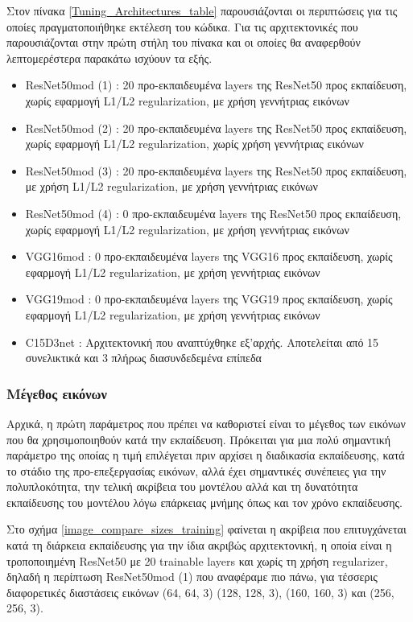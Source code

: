 Στον πίνακα \ref{Tuning_Architectures_table} παρουσιάζονται οι περιπτώσεις για τις οποίες πραγματοποιήθηκε εκτέλεση του κώδικα. Για τις αρχιτεκτονικές που παρουσιάζονται στην πρώτη στήλη του πίνακα και οι οποίες θα αναφερθούν λεπτομερέστερα παρακάτω ισχύουν τα εξής.

\begin{itemize}
\item ResNet50mod (1) : 20 προ-εκπαιδευμένα layers της ResNet50 προς εκπαίδευση, χωρίς εφαρμογή L1/L2 regularization, με χρήση γεννήτριας εικόνων
\item ResNet50mod (2) : 20 προ-εκπαιδευμένα layers της ResNet50 προς εκπαίδευση, χωρίς εφαρμογή L1/L2 regularization, χωρίς χρήση γεννήτριας εικόνων
\item ResNet50mod (3) : 20 προ-εκπαιδευμένα layers της ResNet50 προς εκπαίδευση, με χρήση L1/L2 regularization, με χρήση γεννήτριας εικόνων
\item ResNet50mod (4) : 0 προ-εκπαιδευμένα layers της ResNet50 προς εκπαίδευση, χωρίς εφαρμογή L1/L2 regularization, με χρήση γεννήτριας εικόνων
\item VGG16mod : 0 προ-εκπαιδευμένα layers της VGG16 προς εκπαίδευση, χωρίς εφαρμογή L1/L2 regularization, με χρήση γεννήτριας εικόνων
\item VGG19mod : 0 προ-εκπαιδευμένα layers της VGG19 προς εκπαίδευση, χωρίς εφαρμογή L1/L2 regularization, με χρήση γεννήτριας εικόνων
\item C15D3net : Αρχιτεκτονική που αναπτύχθηκε εξ'αρχής. Αποτελείται από 15 συνελικτικά και 3 πλήρως διασυνδεδεμένα επίπεδα 
\end{itemize}

\subsubsection{Μέγεθος εικόνων}

Αρχικά, η πρώτη παράμετρος που πρέπει να καθοριστεί είναι το μέγεθος των εικόνων που θα χρησιμοποιηθούν κατά την εκπαίδευση. Πρόκειται για μια πολύ σημαντική παράμετρο της οποίας η τιμή επιλέγεται πριν αρχίσει η διαδικασία εκπαίδευσης, κατά το στάδιο της προ-επεξεργασίας εικόνων, αλλά έχει σημαντικές συνέπειες για την πολυπλοκότητα, την τελική ακρίβεια του μοντέλου αλλά και τη δυνατότητα εκπαίδευσης του μοντέλου λόγω επάρκειας μνήμης όπως και τον χρόνο εκπαίδευσης. 

Στο σχήμα \ref{image_compare_sizes_training} φαίνεται η ακρίβεια που επιτυγχάνεται κατά τη διάρκεια εκπαίδευσης για την ίδια ακριβώς αρχιτεκτονική, η οποία είναι η τροποποιημένη ResNet50 με 20 trainable layers και χωρίς τη χρήση regularizer, δηλαδή η περίπτωση ResNet50mod (1) που αναφέραμε πιο πάνω, για τέσσερις διαφορετικές διαστάσεις εικόνων (64, 64, 3) (128, 128, 3), (160, 160, 3) και (256, 256, 3).


